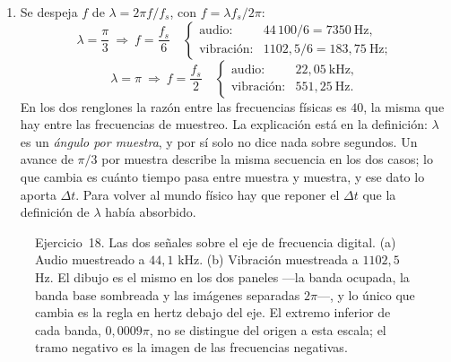 \documentclass[10pt,a4paper]{article}
\begin{document}
\begin{enumerate}
		Dicho de otro modo, las dos secuencias son indistinguibles mientras se las mire como
		secuencias. Nada en ellas registra que una viene de un micrófono y la otra de un
		acelerómetro, ni que los fenómenos que las produjeron transcurren a ritmos que
		difieren en un factor de cuarenta.

		\item Se despeja $f$ de
		$\lambda = 2\pi f/f_s$, con $f = \lambda f_s/2\pi$:
		\[
			\lambda=\frac{\pi}{3}
			\ \Longrightarrow\
			f = \frac{f_s}{6}
			\quad\begin{cases}
				\text{audio:} & 44\,100/6 = 7350\ \text{Hz},\\[2pt]
				\text{vibración:} & 1102{,}5/6 = 183{,}75\ \text{Hz};
			\end{cases}
		\]
		\[
			\lambda=\pi
			\ \Longrightarrow\
			f = \frac{f_s}{2}
			\quad\begin{cases}
				\text{audio:} & 22{,}05\ \text{kHz},\\[2pt]
				\text{vibración:} & 551{,}25\ \text{Hz}.
			\end{cases}
		\]
		En los dos renglones la razón entre las frecuencias físicas es $40$, la misma que hay
		entre las frecuencias de muestreo. La explicación está en la definición: $\lambda$ es
		un \emph{ángulo por muestra}, y por sí solo no dice nada sobre segundos. Un avance de
		$\pi/3$ por muestra describe la misma secuencia en los dos casos; lo que cambia es
		cuánto tiempo pasa entre muestra y muestra, y ese dato lo aporta $\Delta t$. Para
		volver al mundo físico hay que reponer el $\Delta t$ que la definición de $\lambda$
		había absorbido.

	\end{enumerate}

	\begin{figure}[H]
		\centering
		
		\caption{Ejercicio~18. Las dos señales sobre el eje de frecuencia digital.
		(a) Audio muestreado a $44{,}1$ kHz. (b) Vibración muestreada a $1102{,}5$ Hz.
		El dibujo es el mismo en los dos paneles ---la banda ocupada, la banda base
		sombreada y las imágenes separadas $2\pi$---, y lo único que cambia es la regla
		en hertz debajo del eje. El extremo inferior de cada banda, $0{,}0009\pi$, no se
		distingue del origen a esta escala; el tramo negativo es la imagen de las
		frecuencias negativas.}
		\label{fig:sol_ej18}
	\end{figure}
\end{document}
